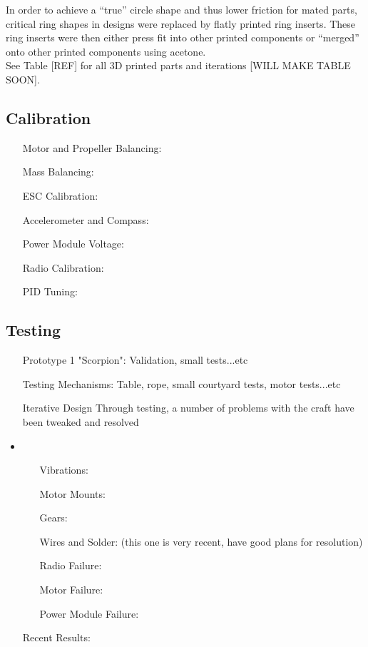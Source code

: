 In order to achieve a ``true'' circle shape and thus lower friction for mated parts, critical ring shapes in designs were replaced by flatly printed ring inserts. These ring inserts were then either press fit into other printed components or ``merged'' onto other printed components using acetone.\\

See Table [REF] for all 3D printed parts and iterations [WILL MAKE TABLE SOON].

	

\subsection{Calibration}
\begin{itemize}
	\item[Motor and Propeller Balancing:]
	\item[Mass Balancing:]
	\item[ESC Calibration:]
	\item[Accelerometer and Compass:]
	\item[Power Module Voltage:]
	\item[Radio Calibration:]
	\item[PID Tuning:]
		
\end{itemize}
\subsection{Testing}
\begin{itemize}
\item[Prototype 1 "Scorpion":] Validation, small tests...etc
\item[Testing Mechanisms:] Table, rope, small courtyard tests, motor tests...etc
\item[Iterative Design] Through testing, a number of problems with the craft have been tweaked and resolved
\item\begin{itemize}
		\item[Vibrations:]
		\item[Motor Mounts:]
		\item[Gears:]
		\item[Wires and Solder:] (this one is very recent, have good plans for resolution)
		\item[Radio Failure:]
		\item[Motor Failure:]
		\item[Power Module Failure:]
		
\end{itemize}
\item[Recent Results:]
\end{itemize}
